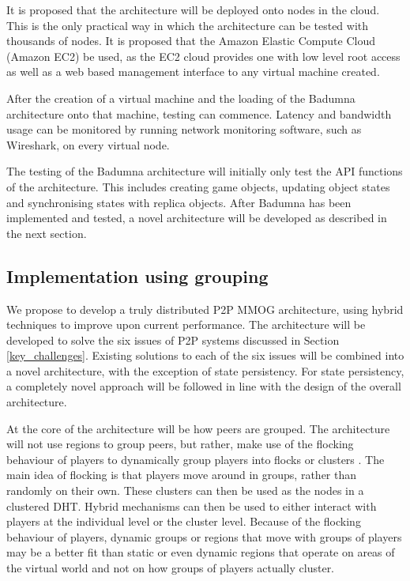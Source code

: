 \documentclass[journal,oneside,a4paper,onecolumn]{IEEEtran}
\begin{document}
It is proposed that the architecture will be deployed onto nodes in the cloud. This is the only practical way in which the architecture can be tested with thousands of nodes. It is proposed that the Amazon Elastic Compute Cloud (Amazon EC2) be used, as the EC2 cloud provides one with low level root access as well as a web based management interface to any virtual machine created.

After the creation of a virtual machine and the loading of the Badumna architecture onto that machine, testing can commence. Latency and bandwidth usage can be monitored by running network monitoring software, such as Wireshark, on every virtual node.

The testing of the Badumna architecture will initially only test the API functions of the architecture. This includes creating game objects, updating object states and synchronising states with replica objects. After Badumna has been implemented and tested, a novel architecture will be developed as described in the next section.

\subsection{Implementation using grouping}
\label{proposed_grouping_architecture}

We propose to develop a truly distributed P2P MMOG architecture, using hybrid techniques to improve upon current performance. The architecture will be developed to solve the six issues of P2P systems discussed in Section \ref{key_challenges}. Existing solutions to each of the six issues will be combined into a novel architecture, with the exception of state persistency. For state persistency, a completely novel approach will be followed in line with the design of the overall architecture.

At the core of the architecture will be how peers are grouped. The architecture will not use regions to group peers, but rather, make use of the flocking behaviour of players to dynamically group players into flocks or clusters \cite{flocking}. The main idea of flocking is that players move around in groups, rather than randomly on their own. These clusters can then be used as the nodes in a clustered \ac{DHT}. Hybrid mechanisms can then be used to either interact with players at the individual level or the cluster level. Because of the flocking behaviour of players, dynamic groups or regions that move with groups of players may be a better fit than static or even dynamic regions that operate on areas of the virtual world and not on how groups of players actually cluster.
\end{document}

